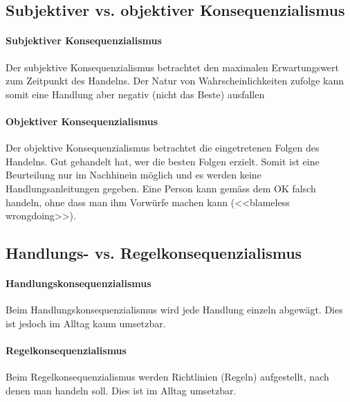 \documentclass[../main.tex]{subfiles}
\begin{document}
\subsection{Subjektiver vs. objektiver Konsequenzialismus}
\paragraph{Subjektiver Konsequenzialismus} Der subjektive Konsequenzialismus betrachtet den maximalen Erwartungswert zum Zeitpunkt des Handelns. Der Natur von Wahrscheinlichkeiten zufolge kann somit eine Handlung aber negativ (nicht das Beste) ausfallen
\paragraph{Objektiver Konsequenzialismus} Der objektive Konsequenzialismus betrachtet die eingetretenen Folgen des Handelns. Gut gehandelt hat, wer die besten Folgen erzielt. Somit ist eine Beurteilung nur im Nachhinein möglich und es werden keine Handlungsanleitungen gegeben. Eine Person kann gemäss dem OK falsch handeln, ohne dass man ihm Vorwürfe machen kann (<<blameless wrongdoing>>).

\subsection{Handlungs- vs. Regelkonsequenzialismus}
\paragraph{Handlungskonsequenzialismus} Beim Handlungskonsequenzialismus wird jede Handlung einzeln abgewägt. Dies ist jedoch im Alltag kaum umsetzbar.
\paragraph{Regelkonsequenzialismus} Beim Regelkonsequenzialismus werden Richtlinien (Regeln) aufgestellt, nach denen man handeln soll. Dies ist im Alltag umsetzbar. 
\end{document}
